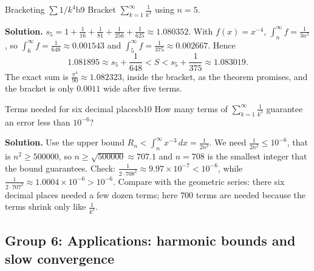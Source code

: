 \documentclass[11pt]{article}
\begin{document}
\begin{exmp}{Bracketing $\sum1/k^4$}{b9}
Bracket $\displaystyle\sum_{k=1}^\infty\frac1{k^4}$ using $n=5$.

\textbf{Solution.} $s_5=1+\frac1{16}+\frac1{81}+\frac1{256}+\frac1{625}\approx1.080352$. With $f(x)=x^{-4}$, $\int_n^\infty f=\frac1{3n^3}$, so $\int_6^\infty f=\frac1{648}\approx0.001543$ and $\int_5^\infty f=\frac1{375}\approx0.002667$. Hence
\[
1.081895\approx s_5+\frac1{648}<S<s_5+\frac1{375}\approx1.083019 .
\]
The exact sum is $\frac{\pi^4}{90}\approx1.082323$, inside the bracket, as the theorem promises, and the bracket is only $0.0011$ wide after five terms.
\end{exmp}

\begin{exmp}{Terms needed for six decimal places}{b10}
How many terms of $\displaystyle\sum_{k=1}^\infty\frac1{k^3}$ guarantee an error less than $10^{-6}$?

\textbf{Solution.} Use the upper bound $R_n<\int_n^\infty x^{-3}\,dx=\frac1{2n^2}$. We need $\frac1{2n^2}\le10^{-6}$, that is $n^2\ge500000$, so $n\ge\sqrt{500000}\approx707.1$ and $n=708$ is the smallest integer that the bound guarantees. Check: $\frac1{2\cdot708^2}\approx9.97\times10^{-7}<10^{-6}$, while $\frac1{2\cdot707^2}\approx1.0004\times10^{-6}>10^{-6}$. Compare with the geometric series: there six decimal places needed a few dozen terms; here $700$ terms are needed because the terms shrink only like $\frac1{k^3}$.
\end{exmp}

\subsection*{Group 6: Applications: harmonic bounds and slow convergence}
\end{document}
